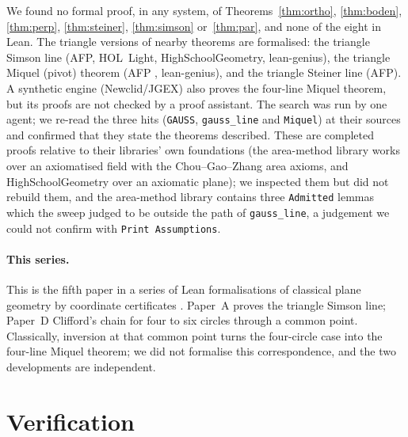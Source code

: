 \documentclass[11pt]{article}
\theoremstyle{definition}
\theoremstyle{remark}
\newcommand{\lean}[1]{\texttt{#1}}
\begin{document}
We found no formal proof, in any system, of Theorems~\ref{thm:ortho}, \ref{thm:boden}, \ref{thm:perp},
\ref{thm:steiner}, \ref{thm:simson} or~\ref{thm:par}, and none of the eight in Lean. The triangle
versions of nearby theorems are formalised: the triangle Simson line (AFP, HOL~Light, HighSchoolGeometry,
lean-genius), the triangle Miquel (pivot) theorem (AFP \cite{afpmiquel}, lean-genius), and the triangle
Steiner line (AFP). A synthetic engine (Newclid/JGEX) also proves the four-line Miquel theorem, but its
proofs are not checked by a proof assistant. The search was run by one agent; we re-read the three
hits (\lean{GAUSS}, \lean{gauss\_line} and \lean{Miquel}) at their sources and confirmed that they state
the theorems described. These are completed proofs relative to their libraries' own foundations
(the area-method library works over an axiomatised field with the Chou--Gao--Zhang area axioms, and
HighSchoolGeometry over an axiomatic plane); we inspected them but did not rebuild them, and the
area-method library contains three \lean{Admitted} lemmas which the sweep judged to be outside the
path of \lean{gauss\_line}, a judgement we could not confirm with \lean{Print Assumptions}.

\paragraph{This series.} This is the fifth paper in a series of Lean formalisations of classical plane
geometry by coordinate certificates \cite{paperA,paperB,paperC,paperD}. Paper~A proves the triangle
Simson line; Paper~D Clifford's chain for four to six circles through a common point. Classically, inversion at
that common point turns the four-circle case into the four-line Miquel theorem; we did not formalise
this correspondence, and the two developments are independent.

\section{Verification}\label{sec:verify}
\end{document}
